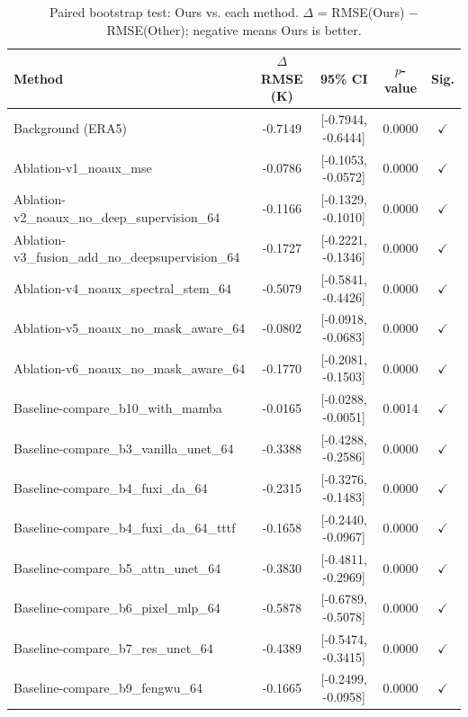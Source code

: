 \begin{table}[htbp]
\centering
\caption{Paired bootstrap test: Ours vs. each method. $\Delta$ = RMSE(Ours) $-$ RMSE(Other); negative means Ours is better.}
\begin{tabular}{lcccc}
\toprule
Method & $\Delta$ RMSE (K) & 95\% CI & $p$-value & Sig. \\
\midrule
Background (ERA5) & -0.7149 & [-0.7944, -0.6444] & 0.0000 & $\checkmark$ \\
Ablation-v1\_noaux\_mse & -0.0786 & [-0.1053, -0.0572] & 0.0000 & $\checkmark$ \\
Ablation-v2\_noaux\_no\_deep\_supervision\_64 & -0.1166 & [-0.1329, -0.1010] & 0.0000 & $\checkmark$ \\
Ablation-v3\_fusion\_add\_no\_deepsupervision\_64 & -0.1727 & [-0.2221, -0.1346] & 0.0000 & $\checkmark$ \\
Ablation-v4\_noaux\_spectral\_stem\_64 & -0.5079 & [-0.5841, -0.4426] & 0.0000 & $\checkmark$ \\
Ablation-v5\_noaux\_no\_mask\_aware\_64 & -0.0802 & [-0.0918, -0.0683] & 0.0000 & $\checkmark$ \\
Ablation-v6\_noaux\_no\_mask\_aware\_64 & -0.1770 & [-0.2081, -0.1503] & 0.0000 & $\checkmark$ \\
Baseline-compare\_b10\_with\_mamba & -0.0165 & [-0.0288, -0.0051] & 0.0014 & $\checkmark$ \\
Baseline-compare\_b3\_vanilla\_unet\_64 & -0.3388 & [-0.4288, -0.2586] & 0.0000 & $\checkmark$ \\
Baseline-compare\_b4\_fuxi\_da\_64 & -0.2315 & [-0.3276, -0.1483] & 0.0000 & $\checkmark$ \\
Baseline-compare\_b4\_fuxi\_da\_64\_tttf & -0.1658 & [-0.2440, -0.0967] & 0.0000 & $\checkmark$ \\
Baseline-compare\_b5\_attn\_unet\_64 & -0.3830 & [-0.4811, -0.2969] & 0.0000 & $\checkmark$ \\
Baseline-compare\_b6\_pixel\_mlp\_64 & -0.5878 & [-0.6789, -0.5078] & 0.0000 & $\checkmark$ \\
Baseline-compare\_b7\_res\_unet\_64 & -0.4389 & [-0.5474, -0.3415] & 0.0000 & $\checkmark$ \\
Baseline-compare\_b9\_fengwu\_64 & -0.1665 & [-0.2499, -0.0958] & 0.0000 & $\checkmark$ \\
\bottomrule
\end{tabular}
\end{table}
